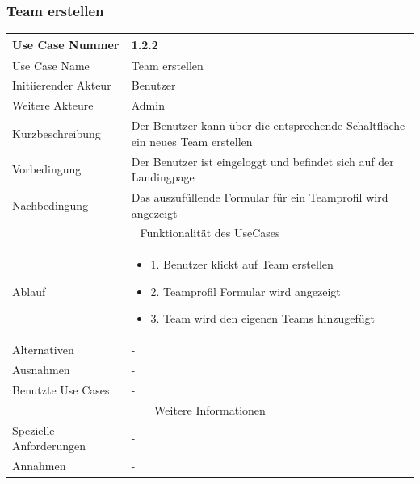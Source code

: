 \documentclass[10pt,a4paper]{article}
\begin{document}
		\subsubsection{Team erstellen}
		\begin{tabular}{|l|p{.5\linewidth}|}
				\hline Use Case Nummer & 1.2.2 \\ 
				\hline Use Case Name & Team erstellen \\ 
				\hline Initiierender Akteur & Benutzer \\
				\hline Weitere Akteure & Admin \\
				\hline Kurzbeschreibung & Der Benutzer kann über die entsprechende Schaltfläche ein neues Team erstellen \\
				\hline Vorbedingung & Der Benutzer ist eingeloggt und befindet sich auf der Landingpage \\
				\hline Nachbedingung & Das auszufüllende Formular für ein Teamprofil wird angezeigt \\
				\hline \multicolumn{2}{|c|}{Funktionalität des UseCases}\\
				\hline Ablauf & \begin{itemize}
					\item 1. Benutzer klickt auf Team erstellen
					\item 2. Teamprofil Formular wird angezeigt
					\item 3. Team wird den eigenen Teams hinzugefügt
				\end{itemize} \\
				\hline Alternativen & - \\
				\hline Ausnahmen & - \\
				\hline Benutzte Use Cases & - \\
				\hline \multicolumn{2}{|c|}{Weitere Informationen} \\
				\hline Spezielle Anforderungen & - \\
				\hline Annahmen & - \\
				\hline
		\end{tabular}
			
\end{document}
